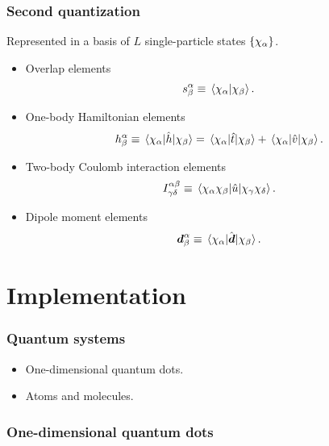 \documentclass{beamer}
\begin{document}
\begin{frame}
    \frametitle{Second quantization}
    Represented in a basis of $L$ single-particle states $\left\{ \chi_{\alpha} \right\}$.
    \begin{itemize}
        \item Overlap elements
            \begin{align}
                s^{\alpha}_{\beta}
                \equiv \braket*{\chi_{\alpha}}{\chi_{\beta}}.
            \end{align}
        \item One-body Hamiltonian elements
            \begin{align}
                h^{\alpha}_{\beta}
                \equiv \mel*{\chi_{\alpha}}{\hat{h}}{\chi_{\beta}}
                = \mel*{\chi_{\alpha}}{\hat{t}}{\chi_{\beta}}
                + \mel*{\chi_{\alpha}}{\hat{v}}{\chi_{\beta}}.
            \end{align}
        \item Two-body Coulomb interaction elements
            \begin{align}
                I^{\alpha\beta}_{\gamma\delta}
                \equiv
                \mel*{\chi_{\alpha}\chi_{\beta}}{
                    \hat{u}
                }{\chi_{\gamma}\chi_{\delta}}.
            \end{align}
        \item Dipole moment elements
            \begin{align}
                \boldsymbol{d}^{\alpha}_{\beta}
                \equiv
                \mel*{\chi_{\alpha}}{\hat{\boldsymbol{d}}}{\chi_{\beta}}.
            \end{align}
    \end{itemize}
\end{frame}

\section{Implementation}

\begin{frame}
    \frametitle{Quantum systems}
    \begin{itemize}
        \item One-dimensional quantum dots.
        \item Atoms and molecules.
    \end{itemize}
\end{frame}

\begin{frame}
    \frametitle{One-dimensional quantum dots}
\end{frame}
\end{document}

